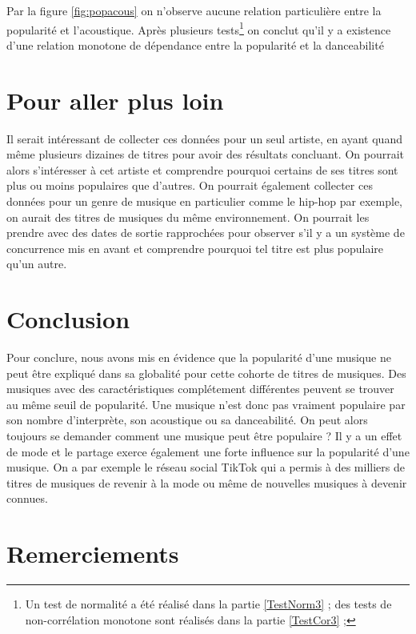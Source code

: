 \documentclass[french,]{compterendu}
\let\rmarkdownfootnote\footnote%
\def\footnote{\protect\rmarkdownfootnote}
\theoremstyle{urcastyle}
\theoremstyle{remark}
\begin{document}
Par la figure \ref{fig:popacous} on n'observe aucune relation particulière entre la popularité et l'acoustique.
Après plusieurs tests\footnote{Un test de normalité a été réalisé dans la partie \ref{TestNorm3} ; des tests de non-corrélation monotone sont réalisés dans la partie \ref{TestCor3} ;} on conclut qu'il y a existence d'une relation monotone de dépendance entre la popularité et la danceabilité

\hypertarget{pour-aller-plus-loin}{%
\section{Pour aller plus loin}\label{pour-aller-plus-loin}}

Il serait intéressant de collecter ces données pour un seul artiste, en ayant quand même plusieurs dizaines de titres pour avoir des résultats concluant. On pourrait alors s'intéresser à cet artiste et comprendre pourquoi certains de ses titres sont plus ou moins populaires que d'autres. \newline
On pourrait également collecter ces données pour un genre de musique en particulier comme le hip-hop par exemple, on aurait des titres de musiques du même environnement. On pourrait les prendre avec des dates de sortie rapprochées pour observer s'il y a un système de concurrence mis en avant et comprendre pourquoi tel titre est plus populaire qu'un autre.

\hypertarget{conclusion}{%
\section{Conclusion}\label{conclusion}}

Pour conclure, nous avons mis en évidence que la popularité d'une musique ne peut être expliqué dans sa globalité pour cette cohorte de titres de musiques. Des musiques avec des caractéristiques complétement différentes peuvent se trouver au même seuil de popularité. Une musique n'est donc pas vraiment populaire par son nombre d'interprète, son acoustique ou sa danceabilité. On peut alors toujours se demander comment
une musique peut être populaire ? Il y a un effet de mode et le partage exerce également une forte
influence sur la popularité d'une musique. On a par exemple le réseau social TikTok qui a permis à des
milliers de titres de musiques de revenir à la mode ou même de nouvelles musiques à devenir connues.

\hypertarget{remerciements}{%
\section*{Remerciements}\label{remerciements}}
\end{document}
